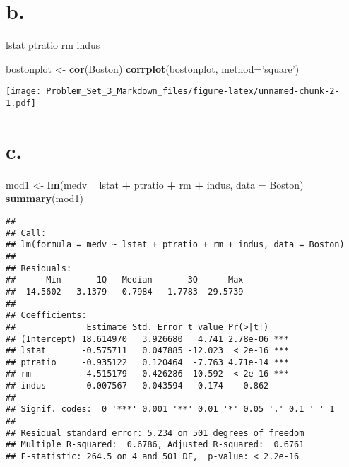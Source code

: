 \documentclass[]{article}
\newenvironment{Shaded}{\begin{snugshade}}{\end{snugshade}}
\newcommand{\KeywordTok}[1]{\textcolor[rgb]{0.13,0.29,0.53}{\textbf{#1}}}
\newcommand{\DataTypeTok}[1]{\textcolor[rgb]{0.13,0.29,0.53}{#1}}
\newcommand{\StringTok}[1]{\textcolor[rgb]{0.31,0.60,0.02}{#1}}
\newcommand{\OperatorTok}[1]{\textcolor[rgb]{0.81,0.36,0.00}{\textbf{#1}}}
\newcommand{\NormalTok}[1]{#1}
\begin{document}
\section{b.}\label{b.-1}

lstat ptratio rm indus

\begin{Shaded}
\begin{Highlighting}[]
\NormalTok{bostonplot <-}\StringTok{ }\KeywordTok{cor}\NormalTok{(Boston)}
\KeywordTok{corrplot}\NormalTok{(bostonplot, }\DataTypeTok{method=}\StringTok{'square'}\NormalTok{)}
\end{Highlighting}
\end{Shaded}

\texttt{[image: Problem\_Set\_3\_Markdown\_files/figure-latex/unnamed-chunk-2-1.pdf]}

\section{c.}\label{c.}

\begin{Shaded}
\begin{Highlighting}[]
\NormalTok{mod1 <-}\StringTok{ }\KeywordTok{lm}\NormalTok{(medv }\OperatorTok{~}\StringTok{ }\NormalTok{lstat }\OperatorTok{+}\StringTok{ }\NormalTok{ptratio }\OperatorTok{+}\StringTok{ }\NormalTok{rm }\OperatorTok{+}\StringTok{ }\NormalTok{indus, }\DataTypeTok{data =}\NormalTok{ Boston)}
\KeywordTok{summary}\NormalTok{(mod1)}
\end{Highlighting}
\end{Shaded}

\begin{verbatim}
## 
## Call:
## lm(formula = medv ~ lstat + ptratio + rm + indus, data = Boston)
## 
## Residuals:
##      Min       1Q   Median       3Q      Max 
## -14.5602  -3.1379  -0.7984   1.7783  29.5739 
## 
## Coefficients:
##              Estimate Std. Error t value Pr(>|t|)    
## (Intercept) 18.614970   3.926680   4.741 2.78e-06 ***
## lstat       -0.575711   0.047885 -12.023  < 2e-16 ***
## ptratio     -0.935122   0.120464  -7.763 4.71e-14 ***
## rm           4.515179   0.426286  10.592  < 2e-16 ***
## indus        0.007567   0.043594   0.174    0.862    
## ---
## Signif. codes:  0 '***' 0.001 '**' 0.01 '*' 0.05 '.' 0.1 ' ' 1
## 
## Residual standard error: 5.234 on 501 degrees of freedom
## Multiple R-squared:  0.6786, Adjusted R-squared:  0.6761 
## F-statistic: 264.5 on 4 and 501 DF,  p-value: < 2.2e-16
\end{verbatim}
\end{document}
